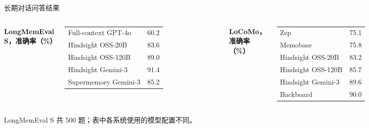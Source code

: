 \begin{frame}{长期对话问答结果}
    \begin{columns}[T,onlytextwidth]
        \textbf{LongMemEval S，准确率（\%）}\par\vspace{2mm}
        \begin{tabular}{@{}lr@{}}
            \toprule
            Full-context GPT-4o & 60.2 \\
            Hindsight OSS-20B & 83.6 \\
            Hindsight OSS-120B & 89.0 \\
            Hindsight Gemini-3 & 91.4 \\
            Supermemory Gemini-3 & 85.2 \\
            \bottomrule
        \end{tabular}
        \textbf{LoCoMo，准确率（\%）}\par\vspace{2mm}
        \begin{tabular}{@{}lr@{}}
            \toprule
            Zep & 75.1 \\
            Memobase & 75.8 \\
            Hindsight OSS-20B & 83.2 \\
            Hindsight OSS-120B & 85.7 \\
            Hindsight Gemini-3 & 89.6 \\
            Backboard & 90.0 \\
            \bottomrule
        \end{tabular}
    \end{columns}
    \vspace{3mm}
    \par\vspace{3mm}LongMemEval S 共 500 题；表中各系统使用的模型配置不同。\par
\end{frame}

